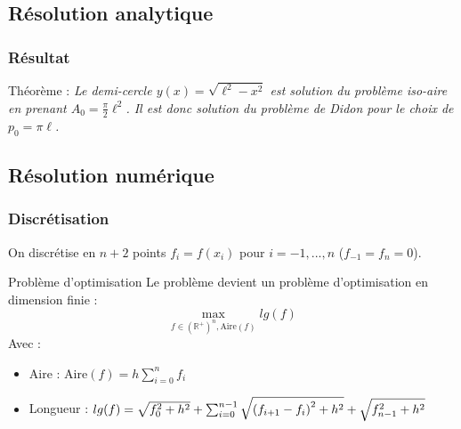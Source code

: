 \documentclass[11pt,envcountsect,aspectratio=169]{beamer} %
\newcommand{\R}{\mathbb{R}}
\newcommand{\A}{\mathrm{Aire}}
\newcommand\thm[2]{%
	\begin{beamerboxesrounded}[upper=titreB,lower=texteB,shadow=true]{Théorème : #1}
		\it #2
	\end{beamerboxesrounded}
	\normalfont
}
\begin{document}
\subsection{Résolution analytique}

\begin{frame}
	\frametitle{Résultat}

	\thm{}{%
		Le demi-cercle $y(x)=\sqrt{\ell^2-x^2}$ est solution du problème iso-aire en prenant $A_0=\frac{\pi}{2}\ell^2$. Il est donc solution du problème de Didon pour le choix de $p_0=\pi\ell$.
	}

\end{frame}





\subsection{Résolution numérique}

\begin{frame}
	\frametitle{Discrétisation}

    On discrétise en $n+2$ points $f_i = f(x_i)$ pour $i=-1,...,n$ ($f_{-1}=f_n=0$).

    \begin{beamerboxesrounded}[upper=titreB,lower=texteB,shadow=true]{Problème d'optimisation}
		Le problème devient un problème d'optimisation en dimension finie :
		\[\max_{f \in \left(\R^+\right)^n, \A(f)} lg(f)\]
		Avec :
		\begin{itemize}
            \item Aire : $\A(f) = h \sum_{i=0}^n{f_i}$
            \item Longueur : $lg(f) =  \sqrt{f_0^2+h^2} + \sum_{i=0}^{n-1}{\sqrt{\vphantom{f_n^2}{(f_{i+1}-f_i)}^2+h^2}} + \sqrt{f_{n-1}^2+h^2} $
        \end{itemize}
    \end{beamerboxesrounded}

\end{frame}
\end{document}
